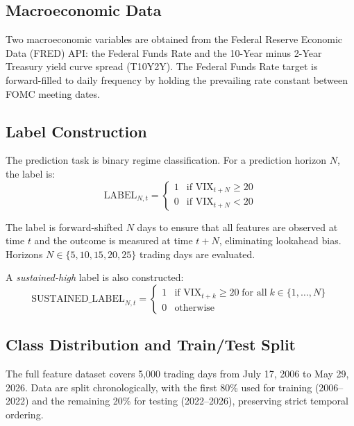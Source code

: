 \documentclass[12pt]{article}
\begin{document}
\subsection{Macroeconomic Data}

Two macroeconomic variables are obtained from the Federal Reserve Economic Data (FRED) API: the
Federal Funds Rate and the 10-Year minus 2-Year Treasury yield curve spread (T10Y2Y). The Federal
Funds Rate target is forward-filled to daily frequency by holding the prevailing rate constant
between FOMC meeting dates.

\subsection{Label Construction}

The prediction task is binary regime classification. For a prediction horizon $N$, the label is:
\begin{equation}
    \text{LABEL}_{N,t} = \begin{cases} 1 & \text{if } \text{VIX}_{t+N} \geq 20 \\ 0 & \text{if } \text{VIX}_{t+N} < 20 \end{cases}
    \label{eq:label}
\end{equation}

The label is forward-shifted $N$ days to ensure that all features are observed at time $t$ and
the outcome is measured at time $t + N$, eliminating lookahead bias. Horizons
$N \in \{5, 10, 15, 20, 25\}$ trading days are evaluated.

A \emph{sustained-high} label is also constructed:
\begin{equation}
    \text{SUSTAINED\_LABEL}_{N,t} = \begin{cases} 1 & \text{if } \text{VIX}_{t+k} \geq 20 \;\text{for all}\; k \in \{1, \ldots, N\} \\ 0 & \text{otherwise} \end{cases}
    \label{eq:sustained}
\end{equation}

\subsection{Class Distribution and Train/Test Split}

The full feature dataset covers 5,000 trading days from July 17, 2006 to May 29, 2026. Data
are split chronologically, with the first 80\% used for training (2006--2022) and the remaining
20\% for testing (2022--2026), preserving strict temporal ordering.
\end{document}
